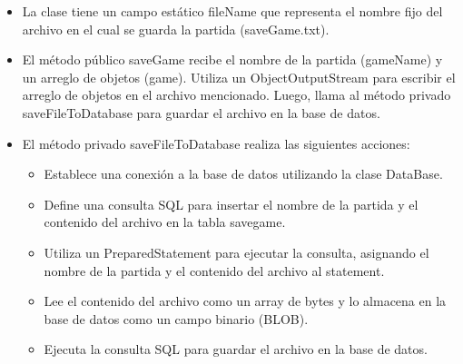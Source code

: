 \documentclass{article}
\begin{document}
        \begin{itemize}	
            \item La clase tiene un campo estático fileName que representa el nombre fijo del archivo en el cual se guarda la partida (saveGame.txt).
            \item El método público saveGame recibe el nombre de la partida (gameName) y un arreglo de objetos (game). Utiliza un ObjectOutputStream para escribir el arreglo de objetos en el archivo mencionado. Luego, llama al método privado saveFileToDatabase para guardar el archivo en la base de datos.
            \item El método privado saveFileToDatabase realiza las siguientes acciones:
            \begin{itemize}	
                \item Establece una conexión a la base de datos utilizando la clase DataBase.
                \item Define una consulta SQL para insertar el nombre de la partida y el contenido del archivo en la tabla savegame.
                \item Utiliza un PreparedStatement para ejecutar la consulta, asignando el nombre de la partida y el contenido del archivo al statement.
                \item Lee el contenido del archivo como un array de bytes y lo almacena en la base de datos como un campo binario (BLOB).
                \item Ejecuta la consulta SQL para guardar el archivo en la base de datos.
            \end{itemize}
	\end{itemize}

    
\end{document}
